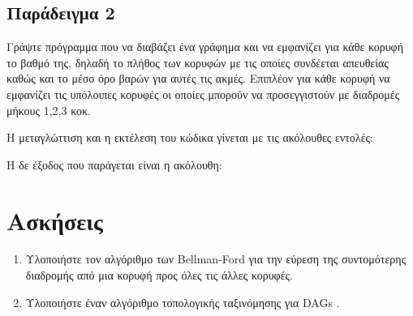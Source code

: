 \subsection{Παράδειγμα 2}
Γράψτε πρόγραμμα που να διαβάζει ένα γράφημα και να εμφανίζει για κάθε κορυφή το βαθμό της, δηλαδή το πλήθος των κορυφών με τις οποίες συνδέεται απευθείας καθώς και το μέσο όρο βαρών για αυτές τις ακμές. Επιπλέον για κάθε κορυφή να εμφανίζει τις υπόλοιπες κορυφές οι οποίες μπορούν να προσεγγιστούν με διαδρομές μήκους 1,2,3 κοκ.



Η μεταγλώττιση και η εκτέλεση του κώδικα γίνεται με τις ακόλουθες εντολές:



Η δε έξοδος που παράγεται είναι η ακόλουθη:



\section{Ασκήσεις}
\begin{enumerate}
	\item Υλοποιήστε τον αλγόριθμο των Bellman-Ford \cite{brilliant_bellman_ford} για την εύρεση της συντομότερης διαδρομής από μια κορυφή προς όλες τις άλλες κορυφές.
	\item Υλοποιήστε έναν αλγόριθμο τοπολογικής ταξινόμησης για DAGs \cite{g4g_topological_sort}.
\end{enumerate}


